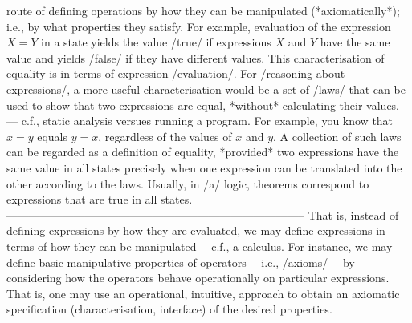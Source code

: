 \documentclass[11pt]{article}
\begin{document}
route of defining operations by how they can be manipulated (*axiomatically*); i.e., by what properties they satisfy.  For example, evaluation of the expression $X = Y$ in a state yields the value /true/ if expressions $X$ and $Y$ have the same value and yields /false/ if they have different values. \quad This characterisation of equality is in terms of expression /evaluation/. \quad For /reasoning about expressions/, a more useful characterisation would be a set of /laws/ that can be used to show that two expressions are equal, *without* calculating their values. --- c.f., static analysis versues running a program.  For example, you know that $x = y$ equals $y = x$, regardless of the values of $x$ and $y$. \quad A collection of such laws can be regarded as a definition of equality, *provided* two expressions have the same value in all states precisely when one expression can be translated into the other according to the laws.  Usually, in /a/ logic, theorems correspond to expressions that are true in all states. --------------------------------------------------------------------------------  That is, instead of defining expressions by how they are evaluated, we may define expressions in terms of how they can be manipulated ---c.f., a calculus.  For instance, we may define basic manipulative properties of operators ---i.e., /axioms/--- by considering how the operators behave operationally on particular expressions. That is, one may use an operational, intuitive, approach to obtain an axiomatic specification (characterisation, interface) of the desired properties. 
\end{document}

